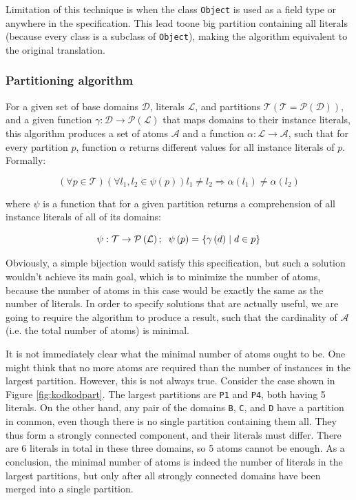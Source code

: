 \documentclass[11pt,twoside,a4paper]{book}
\begin{document}
Limitation of this technique is when the class \verb|Object| is used as a field
type or anywhere in the specification. This lead toone big partition containing
all literals (because every class is a subclass of \verb|Object|), making the
algorithm equivalent to the original translation.

\subsubsection{Partitioning algorithm}
For a given set of base domains $\mathcal{D}$, literals $\mathcal{L}$, and
partitions $\mathcal{T} \left( \mathcal{T} = \mathcal{P}\left( \mathcal{D} \right) \right)$, and a given function $\gamma : \mathcal{D} \rightarrow \mathcal{P}\left( \mathcal{L} \right)$ that maps domains to their instance
literals, this algorithm produces a set of atoms $\mathcal{A}$ and a function $\alpha : \mathcal{L} \rightarrow \mathcal{A}$, such that for every partition
$p$, function $\alpha$ returns different values for all instance literals of
$p$. Formally:

$$\left(\forall p \in \mathcal{T}\right)\left(\forall l_1,l_2 \in
\psi\left(p\right)\right) l_1 \neq l_2 \Longrightarrow \alpha
\left(l_1\right)\neq \alpha \left(l_2\right)$$


where $\psi$ is a function that for a given partition returns a comprehension of
all instance literals of all of its domains:


$$\psi : \mathcal{T}\rightarrow \mathcal{P} \left(\mathcal{L}\right);
\hspace{2mm} \psi\left(p\right) = \{\gamma\left(d\right)\mid d \in p\}$$

Obviously, a simple bijection would satisfy this specification, but such a solution
wouldn't achieve its main goal, which is to minimize the number of atoms, because
the number of atoms in this case would be exactly the same as the number of literals.
In order to specify solutions that are actually useful, we are going to require the
algorithm to produce a result, such that the cardinality of $\mathcal{A}$ (i.e.
the total number of atoms) is minimal.

It is not immediately clear what the minimal number of atoms ought to be. One
might think that no more atoms are required than the number of instances in the
largest partition. However, this is not always true. Consider the case shown in
Figure \ref{fig:kodkodpart}. The largest partitions are \verb|P1| and \verb|P4|,
both having 5 literals. On the other hand, any pair of the domains \verb|B|, \verb|C|, and
\verb|D| have a partition in common, even though there is no single partition
containing them all. They thus form a strongly connected component, and their literals must differ. There are 6 literals in total in
these three domains, so 5 atoms cannot be enough. As a conclusion, the minimal
number of atoms is indeed the number of literals in the largest partitions, but only
after all strongly connected domains have been merged into a single partition.
\end{document}
